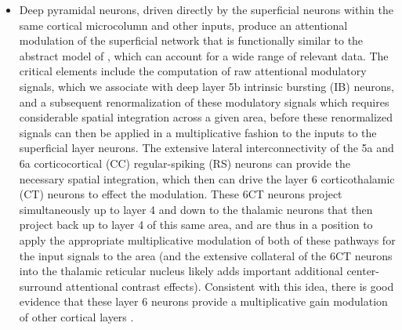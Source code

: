 \documentclass[11pt,twoside]{article}
\newif\myifpdf
\begin{document}
\begin{itemize}
\item Deep pyramidal neurons, driven directly by the superficial neurons within the same cortical microcolumn and other inputs, produce an attentional modulation of the superficial network that is functionally similar to the abstract model of , which can account for a wide range of relevant data.  The critical elements include the computation of raw attentional modulatory signals, which we associate with deep layer 5b intrinsic bursting (IB) neurons, and a subsequent renormalization of these modulatory signals which requires considerable spatial integration across a given area, before these renormalized signals can then be applied in a multiplicative fashion to the inputs to the superficial layer neurons.  The extensive lateral interconnectivity of the 5a and 6a corticocortical (CC) regular-spiking (RS) neurons can provide the necessary spatial integration, which then can drive the layer 6 corticothalamic (CT) neurons to effect the modulation.  These 6CT neurons project simultaneously up to layer 4 and down to the thalamic neurons that then project back up to layer 4 of this same area, and are thus in a position to apply the appropriate multiplicative modulation of both of these pathways for the input signals to the area (and the extensive collateral of the 6CT neurons into the thalamic reticular nucleus likely adds important additional center-surround attentional contrast effects).  Consistent with this idea, there is good evidence that these layer 6 neurons provide a multiplicative gain modulation of other cortical layers \cite{OlsenBortoneAdesnikEtAl12,BortoneOlsenScanziani14}.


\end{itemize}
\end{document}
